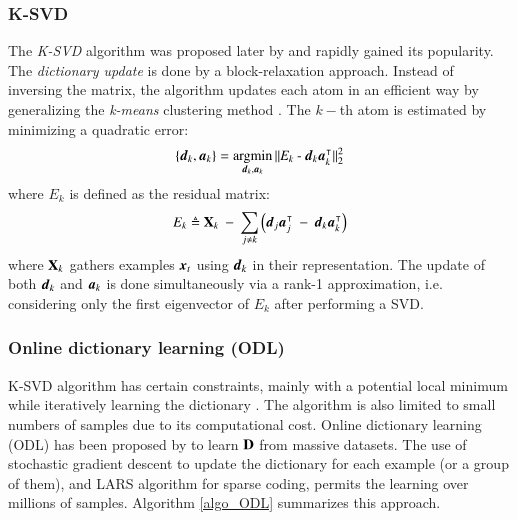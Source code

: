 \subsubsection{K-SVD}
The \textit{K-SVD} algorithm was proposed later by \citet{aharon2006ksvd} and rapidly gained its popularity. The \textit{dictionary update} is done by a block-relaxation approach. Instead of inversing the matrix, the algorithm updates each atom in an efficient way by generalizing the \textit{k-means} clustering method \citep{bishop2006pattern}. The $ k- $th atom is estimated by minimizing a quadratic error:
\begin{equation}
	\left\lbrace \boldsymbol{d}_k, \boldsymbol{a}_k \right\rbrace = \operatorname*{\arg\!\min}_{\boldsymbol{d}_k, \boldsymbol{a}_k} \operatorname{\Arrowvert \mathit{E_k \: - \: \boldsymbol{d}_k \boldsymbol{a}_k^\intercal} \Arrowvert^2_2 }
\end{equation} 
where $  E_k $ is defined as the residual matrix:
\begin{equation}
E_k \triangleq \mathbf{X}_k \: - \: \sum_{j\neq k} \left(\boldsymbol{d}_j \boldsymbol{a}_j^\intercal \: - \: \boldsymbol{d}_k \boldsymbol{a}_k^\intercal\right)
\end{equation}
where $ \mathbf{X}_k $ gathers examples $ \operatorname{\boldsymbol{x}}_t $ using $ \boldsymbol{d}_k $ in their representation. The update of both $ \boldsymbol{d}_k $ and $ \boldsymbol{a}_k $ is done simultaneously via a rank-1 approximation, i.e. considering only the first eigenvector of $ E_k $ after performing a SVD.

\subsubsection{Online dictionary learning (ODL)}
K-SVD algorithm has certain constraints, mainly with a potential local minimum while iteratively learning the dictionary \citep{rubinstein2010dictionaries}. The algorithm is also limited to small numbers of samples due to its computational cost. Online dictionary learning (ODL) has been proposed by \citet{mairal2010online} to learn $ \mathbf{D} $ from massive datasets. The use of stochastic gradient descent to update the dictionary for each example (or a group of them), and LARS algorithm for sparse coding, permits the learning over millions of samples. Algorithm \ref{algo_ODL} summarizes this approach.

